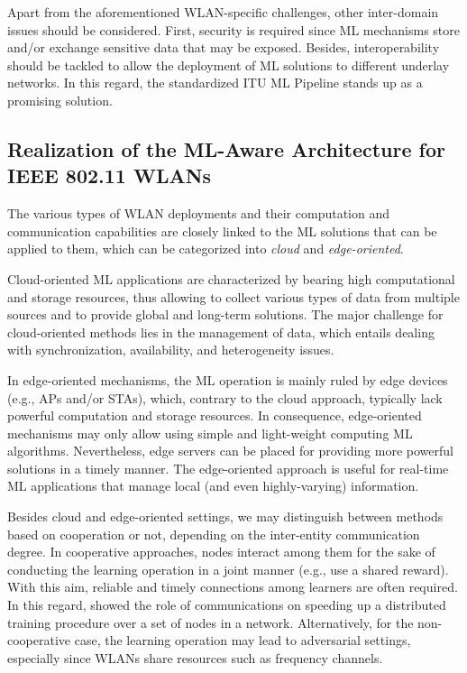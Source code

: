 \documentclass[journal]{IEEEtran}
\begin{document}
Apart from the aforementioned WLAN-specific challenges, other inter-domain issues should be considered. First, security is required since ML mechanisms store and/or exchange sensitive data that may be exposed. Besides, interoperability should be tackled to allow the deployment of ML solutions to different underlay networks. In this regard, the standardized ITU ML Pipeline stands up as a promising solution.

\subsection{Realization of the ML-Aware Architecture for IEEE 802.11 WLANs}
The various types of WLAN deployments and their computation and communication capabilities are closely linked to the ML solutions that can be applied to them, which can be categorized into \emph{cloud} and \emph{edge-oriented}. 

Cloud-oriented ML applications are characterized by
bearing high computational and storage resources, thus allowing to collect various types of data from multiple sources and to provide global and long-term solutions. The major challenge for cloud-oriented methods lies in the management of data, which entails dealing with synchronization, availability, and heterogeneity issues.

In edge-oriented mechanisms, the ML operation is mainly ruled by edge devices (e.g., APs and/or STAs), which, contrary to the cloud approach, typically lack powerful computation and storage resources. In consequence, edge-oriented mechanisms may only allow using simple and light-weight computing ML algorithms. Nevertheless, edge servers can be placed for providing more powerful solutions in a timely manner. The edge-oriented approach is useful for real-time ML applications that manage local (and even highly-varying) information.

Besides cloud and edge-oriented settings, we may distinguish between methods based on cooperation or not, depending on the inter-entity communication degree. In cooperative approaches, nodes interact among them for the sake of conducting the learning operation in a joint manner (e.g., use a shared reward). With this aim, reliable and timely connections among learners are often required. In this regard, \cite{lin2017deep} showed the role of communications on speeding up a distributed training procedure over a set of nodes in a network. Alternatively, for the non-cooperative case, the learning operation may lead to adversarial settings, especially since WLANs share resources such as frequency channels.
\end{document}
